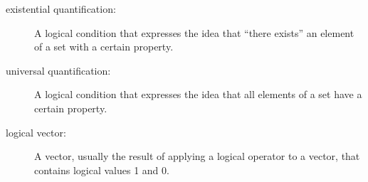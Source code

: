 \begin{description}

\item[existential quantification:] A logical condition that expresses the idea that ``there exists'' an element of a set with a certain property.

\item[universal quantification:] A logical condition that expresses
the idea that all elements of a set have a certain property.

\item[logical vector:] A vector, usually the result of applying a logical operator to a vector, that contains logical values 1 and 0.

\end{description}



